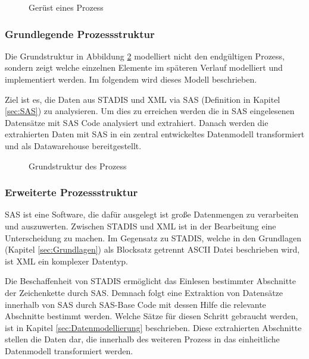 		\begin{figure}[htbp]
				\caption{Gerüst eines Prozess}
				\label{fig:Gerüst}
		\end{figure}
		
		\subsubsection{Grundlegende Prozessstruktur}
			Die Grundstruktur in Abbildung \ref{fig:Grundstruktur} modelliert nicht den endgültigen Prozess, sondern zeigt welche einzelnen Elemente im späteren Verlauf modelliert und implementiert werden. 
			Im folgendem wird dieses Modell beschrieben. 
		
			Ziel ist es, die Daten aus STADIS und XML via SAS (Definition in Kapitel \ref{sec:SAS}) zu analysieren. Um dies zu erreichen werden die in SAS eingelesenen Datensätze mit SAS Code analysiert und extrahiert. 
			Danach werden die extrahierten Daten mit SAS in ein zentral entwickeltes Datenmodell transformiert und als Datawarehouse bereitgestellt. 

			\begin{figure}[htbp]
				\caption{Grundstruktur des Prozess}
				\label{fig:Grundstruktur}
			\end{figure}		
		\subsubsection{Erweiterte Prozessstruktur}\label{sec:ProzessErweitert}
			SAS ist eine Software, die dafür ausgelegt ist große Datenmengen zu verarbeiten und auszuwerten. 
			Zwischen STADIS und XML ist in der Bearbeitung eine Unterscheidung zu machen. 
			Im Gegensatz zu STADIS, welche in den Grundlagen (Kapitel \ref{sec:Grundlagen}) als Blocksatz getrennt ASCII Datei beschrieben wird, ist XML ein komplexer Datentyp.
			
			Die Beschaffenheit von STADIS ermöglicht das Einlesen bestimmter Abschnitte der Zeichenkette durch SAS. 
			Demnach folgt eine Extraktion von Datensätze innerhalb von SAS durch SAS-Base Code mit dessen Hilfe die relevante Abschnitte bestimmt werden.
			Welche Sätze für diesen Schritt gebraucht werden, ist in Kapitel \ref{sec:Datenmodellierung} beschrieben. 
			Diese extrahierten Abschnitte stellen die Daten dar, die innerhalb des weiteren Prozess in das einheitliche Datenmodell transformiert werden.
			
